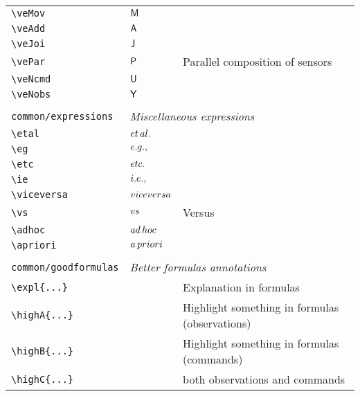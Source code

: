 \begin{longtable}{lll}
 {\color[rgb]{0.5,0.5,0.5}\texttt{\textbackslash veMov}} & $\mathsf{M}$ & \\ 
 {\color[rgb]{0.5,0.5,0.5}\texttt{\textbackslash veAdd}} & $\mathsf{A}$ & \\ 
 {\color[rgb]{0.5,0.5,0.5}\texttt{\textbackslash veJoi}} & $\mathsf{J}$ & \\ 
 {\color[rgb]{0.5,0.5,0.5}\texttt{\textbackslash vePar}} & $\mathsf{P}$ &  Parallel composition of sensors\\ 
 {\color[rgb]{0.5,0.5,0.5}\texttt{\textbackslash veNcmd}} & $\mathsf{U}$ & \\ 
 {\color[rgb]{0.5,0.5,0.5}\texttt{\textbackslash veNobs}} & $\mathsf{Y}$ & \\ 
  &  & \\ 
 {\color[rgb]{0.5,0.5,0.5}\texttt{common/expressions}} & \multicolumn{2}{l}{\emph{Miscellaneous expressions}}\\ 
 \hline
{\color[rgb]{0.5,0.5,0.5}\texttt{\textbackslash etal}} & ${et\,al.}$ & \\ 
 {\color[rgb]{0.5,0.5,0.5}\texttt{\textbackslash eg}} & ${e.g.},$ & \\ 
 {\color[rgb]{0.5,0.5,0.5}\texttt{\textbackslash etc}} & ${etc.}$ & \\ 
 {\color[rgb]{0.5,0.5,0.5}\texttt{\textbackslash ie}} & ${i.e.},$ & \\ 
 {\color[rgb]{0.5,0.5,0.5}\texttt{\textbackslash viceversa}} & ${vice versa}$ & \\ 
 {\color[rgb]{0.5,0.5,0.5}\texttt{\textbackslash vs}} & ${vs}$ &  Versus\\ 
 {\color[rgb]{0.5,0.5,0.5}\texttt{\textbackslash adhoc}} & ${ad\,hoc}$ & \\ 
 {\color[rgb]{0.5,0.5,0.5}\texttt{\textbackslash apriori}} & ${a\,priori}$ & \\ 
  &  & \\ 
 {\color[rgb]{0.5,0.5,0.5}\texttt{common/goodformulas}} & \multicolumn{2}{l}{\emph{Better formulas annotations}}\\ 
 \hline
{\color[rgb]{0.5,0.5,0.5}\texttt{\textbackslash expl\{...\}}} &  &  Explanation in formulas\\ 
 {\color[rgb]{0.5,0.5,0.5}\texttt{\textbackslash highA\{...\}}} &  &  Highlight something in formulas (observations)\\ 
 {\color[rgb]{0.5,0.5,0.5}\texttt{\textbackslash highB\{...\}}} &  &  Highlight something in formulas (commands)\\ 
 {\color[rgb]{0.5,0.5,0.5}\texttt{\textbackslash highC\{...\}}} &  &  both observations and commands\\ 

\end{longtable}
